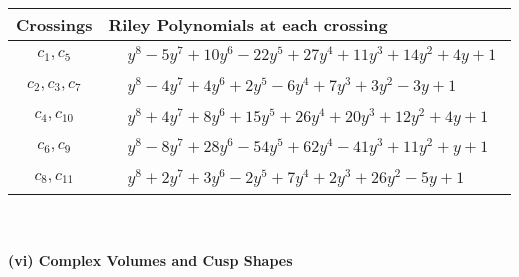 \documentclass[1p]{elsarticle_modified}
\theoremstyle{definition}
\begin{document}
\begin{tabular}{m{50pt}|m{274pt}}
Crossings & \hspace{64pt}Riley Polynomials at each crossing \\
\hline $$\begin{aligned}c_{1},c_{5}\end{aligned}$$&$\begin{aligned}
&y^8-5 y^7+10 y^6-22 y^5+27 y^4+11 y^3+14 y^2+4 y+1
\end{aligned}$\\
\hline $$\begin{aligned}c_{2},c_{3},c_{7}\end{aligned}$$&$\begin{aligned}
&y^8-4 y^7+4 y^6+2 y^5-6 y^4+7 y^3+3 y^2-3 y+1
\end{aligned}$\\
\hline $$\begin{aligned}c_{4},c_{10}\end{aligned}$$&$\begin{aligned}
&y^8+4 y^7+8 y^6+15 y^5+26 y^4+20 y^3+12 y^2+4 y+1
\end{aligned}$\\
\hline $$\begin{aligned}c_{6},c_{9}\end{aligned}$$&$\begin{aligned}
&y^8-8 y^7+28 y^6-54 y^5+62 y^4-41 y^3+11 y^2+y+1
\end{aligned}$\\
\hline $$\begin{aligned}c_{8},c_{11}\end{aligned}$$&$\begin{aligned}
&y^8+2 y^7+3 y^6-2 y^5+7 y^4+2 y^3+26 y^2-5 y+1
\end{aligned}$\\
\hline
\end{tabular}\\~\\
\newpage\flushleft \textbf{(vi) Complex Volumes and Cusp Shapes}
\end{document}
